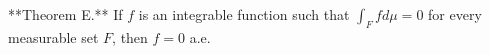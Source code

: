 **Theorem E.** If $f$ is an integrable function such that $\int_F f d\mu = 0$ for every measurable set $F$, then $f = 0$ a.e.
